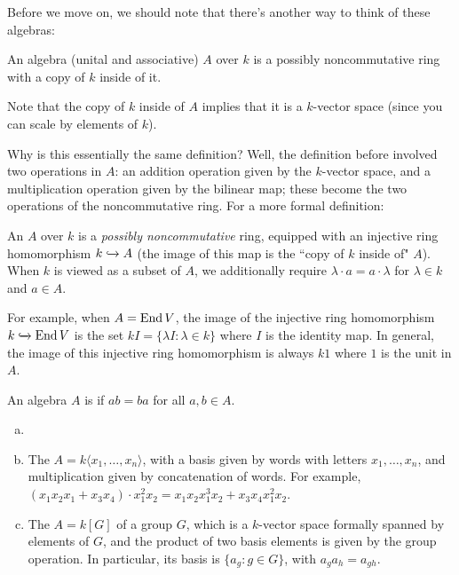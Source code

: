 Before we move on, we should note that there's another way to think of these algebras:

\begin{moral}
An algebra (unital and associative) $A$ over $k$ is a possibly noncommutative ring with a copy of $k$ inside of it. 
\end{moral}

Note that the copy of $k$ inside of $A$ implies that it is a $k$-vector space (since you can scale by elements of $k$). 

Why is this essentially the same definition? Well, the definition before involved two operations in $A$: an addition operation given by the $k$-vector space, and a multiplication operation given by the bilinear map; these become the two operations of the noncommutative ring. For a more formal definition:

\begin{definition}
An  $A$ over $k$ is a \textit{possibly noncommutative} ring, equipped with an injective ring homomorphism $k\xhookrightarrow{} A$ (the image of this map is the ``copy of $k$ inside of" $A$). When $k$ is viewed as a subset of $A$, we additionally require $\lambda\cdot a =a\cdot \lambda$ for $\lambda\in k$ and $a\in A$.
\end{definition}

For example, when $A=\operatorname{End} V$, the image of the injective ring homomorphism $k\xhookrightarrow{} \operatorname{End} V$ is the set $kI=\{\lambda I:\lambda\in k\}$ where $I$ is the identity map. In general, the image of this injective ring homomorphism is always $k1$ where $1$ is the unit in $A$.

\begin{definition}
An algebra $A$ is  if $ab=ba$ for all $a,b\in A$. 
\end{definition}

\begin{example}
\begin{enumerate}[(a)]
    \item[]
    \item The  $A=k\langle x_1,\dots,x_n\rangle$, with a basis given by words with letters $x_1,\dots,x_n$, and multiplication given by concatenation of words. For example, $(x_1x_2x_1+x_3x_4)\cdot x_1^2x_2=x_1x_2x_1^3x_2+x_3x_4x_1^2x_2$.
    \item The  $A=k[G]$ of a group $G$, which is a $k$-vector space formally spanned by elements of $G$, and the product of two basis elements is given by the group operation. In particular, its basis is $\{a_g:g\in G\}$, with $a_ga_h=a_{gh}$. 
\end{enumerate}
\end{example}

